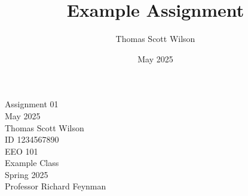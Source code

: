 \documentclass{exam}
\title{Example Assignment}
\author{Thomas Scott Wilson}
\date{May 2025}
\begin{document}
    \raggedright
    \pointformat{}
    \thispagestyle{plain}
    \setlength{\jot}{3ex}

    \begin{titlepage}

        \centering
        \vspace*{\baselineskip}
        Assignment 01\\
         May 2025\\
        \vfill
        Thomas Scott Wilson\\
        \medskip
        ID 1234567890 \\
        \vfill
        EEO 101\\
        \medskip
        Example Class\\
        \medskip
        Spring 2025 \\
        \medskip
        Professor Richard Feynman \\
        \vfill

    \end{titlepage}
\end{document}
